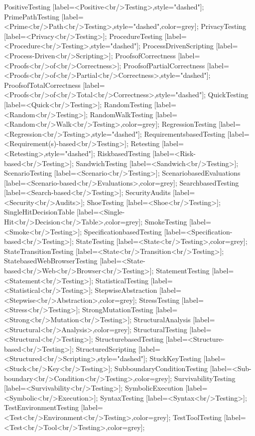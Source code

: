 \documentclass{article}
\begin{document}
{PositiveTesting [label=<Positive<br/>Testing>,style="dashed"];
PrimePathTesting [label=<Prime<br/>Path<br/>Testing>,style="dashed",color=grey];
PrivacyTesting [label=<Privacy<br/>Testing>];
ProcedureTesting [label=<Procedure<br/>Testing>,style="dashed"];
ProcessDrivenScripting [label=<Process-Driven<br/>Scripting>];
ProofsofCorrectness [label=<Proofs<br/>of<br/>Correctness>];
ProofsofPartialCorrectness [label=<Proofs<br/>of<br/>Partial<br/>Correctness>,style="dashed"];
ProofsofTotalCorrectness [label=<Proofs<br/>of<br/>Total<br/>Correctness>,style="dashed"];
QuickTesting [label=<Quick<br/>Testing>];
RandomTesting [label=<Random<br/>Testing>];
RandomWalkTesting [label=<Random<br/>Walk<br/>Testing>,color=grey];
RegressionTesting [label=<Regression<br/>Testing>,style="dashed"];
RequirementsbasedTesting [label=<Requirement(s)-based<br/>Testing>];
Retesting [label=<Retesting>,style="dashed"];
RiskbasedTesting [label=<Risk-based<br/>Testing>];
SandwichTesting [label=<Sandwich<br/>Testing>];
ScenarioTesting [label=<Scenario<br/>Testing>];
ScenariobasedEvaluations [label=<Scenario-based<br/>Evaluations>,color=grey];
SearchbasedTesting [label=<Search-based<br/>Testing>];
SecurityAudits [label=<Security<br/>Audits>];
ShoeTesting [label=<Shoe<br/>Testing>];
SingleHitDecisionTable [label=<Single-Hit<br/>Decision<br/>Table>,color=grey];
SmokeTesting [label=<Smoke<br/>Testing>];
SpecificationbasedTesting [label=<Specification-based<br/>Testing>];
StateTesting [label=<State<br/>Testing>,color=grey];
StateTransitionTesting [label=<State<br/>Transition<br/>Testing>];
StatebasedWebBrowserTesting [label=<State-based<br/>Web<br/>Browser<br/>Testing>];
StatementTesting [label=<Statement<br/>Testing>];
StatisticalTesting [label=<Statistical<br/>Testing>];
StepwiseAbstraction [label=<Stepwise<br/>Abstraction>,color=grey];
StressTesting [label=<Stress<br/>Testing>];
StrongMutationTesting [label=<Strong<br/>Mutation<br/>Testing>];
StructuralAnalysis [label=<Structural<br/>Analysis>,color=grey];
StructuralTesting [label=<Structural<br/>Testing>];
StructurebasedTesting [label=<Structure-based<br/>Testing>];
StructuredScripting [label=<Structured<br/>Scripting>,style="dashed"];
StuckKeyTesting [label=<Stuck<br/>Key<br/>Testing>];
SubboundaryConditionTesting [label=<Sub-boundary<br/>Condition<br/>Testing>,color=grey];
SurvivabilityTesting [label=<Survivability<br/>Testing>];
SymbolicExecution [label=<Symbolic<br/>Execution>];
SyntaxTesting [label=<Syntax<br/>Testing>];
TestEnvironmentTesting [label=<Test<br/>Environment<br/>Testing>,color=grey];
TestToolTesting [label=<Test<br/>Tool<br/>Testing>,color=grey];
}
\end{document}

